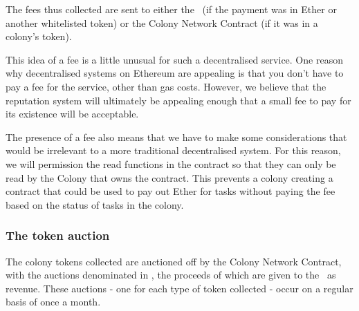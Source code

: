 \begin{center}
\end{center}

The fees thus collected are sent to either the \rc\ (if the payment was in Ether or another whitelisted token) or the Colony Network Contract (if it was in a colony's token).


This idea of a fee is a little unusual for such a decentralised service. One reason why decentralised systems on Ethereum are appealing is that you don't have to pay a fee for the service, other than gas costs. However, we believe that the reputation system will ultimately be appealing enough that a small fee to pay for its existence will be acceptable.

The presence of a fee also means that we have to make some considerations that would be irrelevant to a more traditional decentralised system. For this reason, we will permission the read functions in the  contract so that they can only be read by the Colony that owns the  contract. This prevents a colony creating a contract that could be used to pay out Ether for tasks without paying the fee based on the status of tasks in the colony.

\subsubsection{The token auction}
The colony tokens collected are auctioned off by the Colony Network Contract, with the auctions denominated in \rcts, the proceeds of which are given to the \rc\ as revenue. These auctions - one for each type of token collected - occur on a regular basis of once a month.

